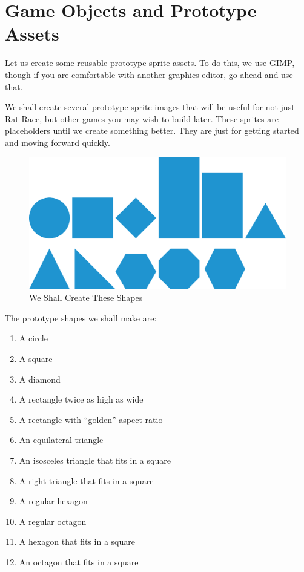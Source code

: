 \documentclass[12pt]{amsbook}
\theoremstyle{definition}
\theoremstyle{remark}
\numberwithin{figure}{chapter}
\numberwithin{table}{chapter}
\numberwithin{section}{chapter}
\numberwithin{equation}{section}
\begin{document}
\section{Game Objects and Prototype Assets}
Let us create some reusable prototype sprite assets.  To do this, we use GIMP, though if you are comfortable with another graphics editor, go ahead and use that.

We shall create several prototype sprite images that will be useful for not just Rat Race, but other games you may wish to build later.  These sprites are placeholders until we create something better.  They are just for getting started and moving forward quickly.


\begin{figure}[h]
  \includegraphics[width=6in]{shapes.png}
  \caption{We Shall Create These Shapes}
  \label{fig:shapes}
\end{figure}

The prototype shapes we shall make are:

\begin{enumerate}
\item A circle
\item A square
\item A diamond
\item A rectangle twice as high as wide
\item A rectangle with ``golden'' aspect ratio
\item An equilateral triangle
\item An isosceles triangle that fits in a square
\item A right triangle that fits in a square
\item A regular hexagon
\item A regular octagon
\item A hexagon that fits in a square
\item An octagon that fits in a square
\end{enumerate}
\end{document}
